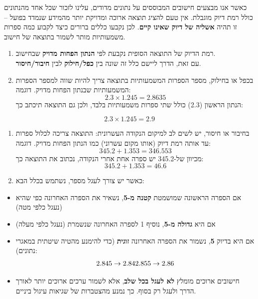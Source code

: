 \documentclass[
  hebrew,
  letterpaper,
  DIV=11,
  numbers=noendperiod]{scrreprt}
\begin{document}
{כאשר אנו מבצעים חישובים המבוססים על נתונים מדודים, עלינו לזכור שכל אחד
מהנתונים כולל רמת דיוק מוגבלת}. {אין טעם להציג תוצאה ארוכה ומדויקת יותר
מהמידע שנמדד בפועל -- זו תהיה \textbf{אשליה של דיוק שאינו קיים}}. {לכן
נקבעו כללים ברורים כיצד לקבוע כמה ספרות משמעותיות מותר לשמור בתוצאה של
חישוב}.

\begin{enumerate}
\def\labelenumi{\arabic{enumi}.}
\item
  {רמת הדיוק של התוצאה הסופית נקבעת לפי \textbf{הנתון הפחות מדויק}
  שבחישוב}.\\
  {עם זאת, הדרך ליישם כלל זה שונה בין \textbf{כפל/חילוק} לבין
  \textbf{חיבור/חיסור}}.
\item
  {בכפל או בחילוק, מספר הספרות המשמעותיות בתוצאה צריך להיות שווה למספר
  הספרות המשמעותיות שבנתון הפחות מדויק}. {דוגמה}:{\hfill\break
  }\[2.3 \times 1.245 = 2.8635\] {הנתון הראשון (2.3) כולל שתי ספרות
  משמעותיות בלבד, ולכן גם התוצאה תיכתב כך}:
\end{enumerate}

\[2.3 \times 1.245 = \mathbf{2.9}\]

\begin{enumerate}
\def\labelenumi{\arabic{enumi}.}
\setcounter{enumi}{2}
\item
  {בחיבור או חיסור, יש לשים לב למיקום הנקודה העשרונית}:{\hfill\break
  התוצאה צריכה לכלול ספרות עד אותה רמת דיוק (אותו מקום עשרוני) כמו הנתון
  הפחות מדויק}. {דוגמה}: {\hfill\break
  }\[345.2 + 1.353 = 346.553\] {מכיוון של-345.2 יש ספרה אחת אחרי הנקודה,
  נכתוב את התוצאה כך}:{\hfill\break
  }\[345.2 + 1.353 = \mathbf{46.6}\]
\item
  {כאשר יש צורך לעגל מספר, נשתמש בכלל הבא}:
\end{enumerate}

\begin{itemize}
\item
  {אם הספרה הראשונה שמושמטת \textbf{קטנה מ-5}}, {נשאיר את הספרה האחרונה
  כפי שהיא (נעגל כלפי מטה)}
\item
  {אם היא \textbf{גדולה מ-5}}, {נוסיף 1 לספרה האחרונה שנשמרת (נעגל כלפי
  מעלה)}
\item
  אם היא בדיוק \textbf{5}, נשמור את הספרה האחרונה \textbf{זוגית} (כדי
  להימנע מהטיה שיטתית במאגרי נתונים): \[
  2.845 \rightarrow 2.84 \\
  2.855 \rightarrow 2.86
  \]
\item
  {חישובים ארוכים מומלץ \textbf{לא לעגל בכל שלב}}, {אלא לשמור ערכים
  ארוכים יותר לאורך הדרך ולעגל רק בסוף}. {כך נמנע מהצטברות של שגיאות
  עיגול ביניים}.
\end{itemize}
\end{document}

